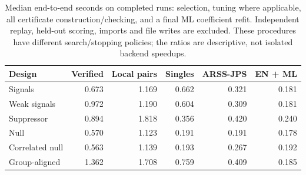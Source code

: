 \begin{table}[H]\centering\small
\begin{tabular}{lrrrrr}
\toprule
Design & Verified & Local pairs & Singles & ARSS-JPS & EN + ML \\
\midrule
Signals & 0.673 & 1.169 & 0.662 & 0.321 & 0.181 \\
Weak signals & 0.972 & 1.190 & 0.604 & 0.309 & 0.181 \\
Suppressor & 0.894 & 1.818 & 0.356 & 0.420 & 0.240 \\
Null & 0.570 & 1.123 & 0.191 & 0.191 & 0.178 \\
Correlated null & 0.563 & 1.139 & 0.193 & 0.267 & 0.192 \\
Group-aligned & 1.362 & 1.708 & 0.759 & 0.409 & 0.185 \\
\bottomrule
\end{tabular}
\caption{Median end-to-end seconds on completed runs: selection, tuning where applicable, all certificate construction/checking, and a final ML coefficient refit. Independent replay, held-out scoring, imports and file writes are excluded. These procedures have different search/stopping policies; the ratios are descriptive, not isolated backend speedups.}\label{tab:comparison_time}
\end{table}
